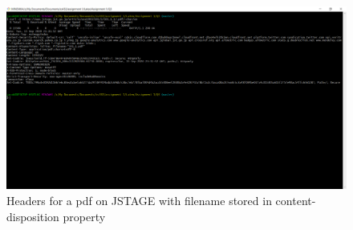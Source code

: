 \documentclass[12pt]{article}
\begin{document}
\begin{figure}[H]
    \centering
    \includegraphics[trim=0 60 10 20, clip, width=\textwidth] {Q3/q3_jstage_curl.PNG}
    \caption{Headers for a pdf on JSTAGE with filename stored in content-disposition property }
    \label{fig:q3JSTAGE_headers}
\end{figure}




\end{document}
